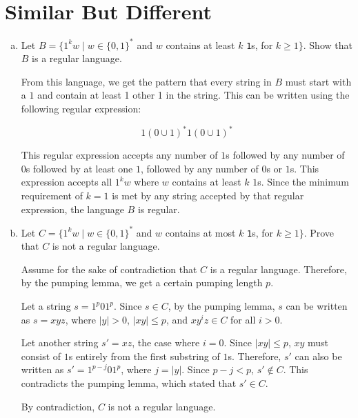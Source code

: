 \documentclass{article}
\begin{document}
    \section{Similar But Different}
        \begin{enumerate}[(a)]
            \item Let $B = \{1^k w \mid w \in \{0, 1\}^*$ and $w$ contains at least $k$ \texttt{1}s, for $k \ge 1\}$. Show that $B$ is a regular language.

                From this language, we get the pattern that every string in $B$ must start with a $1$ and contain at least 1 other 1 in the string. This can be written using the following regular expression:

                \begin{equation*}
                    1(0 \cup 1)^*1(0 \cup 1)^*
                \end{equation*}

                This regular expression accepts any number of $1$s followed by any number of $0$s followed by at least one $1$, followed by any number of $0$s or $1$s. This expression accepts all $1^k w$ where $w$ contains at least $k$ $1$s. Since the minimum requirement of $k = 1$ is met by any string accepted by that regular expression, the language $B$ is regular. 

            \item Let $C = \{1^k w \mid w \in \{0, 1\}^*$ and $w$ contains at most $k$ \texttt{1}s, for $k \ge 1\}$. Prove that $C$ is not a regular language.

                Assume for the sake of contradiction that $C$ is a regular language. Therefore, by the pumping lemma, we get a certain pumping length $p$. 

                Let a string $s = 1^p 0 1^p$. Since $s \in C$, by the pumping lemma, $s$ can be written as $s = xyz$, where $|y| > 0$, $|xy| \le p$, and $xy^iz \in C$ for all $i > 0$. 

                Let another string $s' = xz$, the case where $i = 0$. Since $|xy| \le p$, $xy$ must consist of $1$s entirely from the first substring of $1$s. Therefore, $s'$ can also be written as $s' = 1^{p-j} 0 1^p$, where $j = |y|$. Since $p-j < p$, $s' \notin C$. This contradicts the pumping lemma, which stated that $s' \in C$. 

                By contradiction, $C$ is not a regular language.
                
        \end{enumerate}

    
\end{document}
